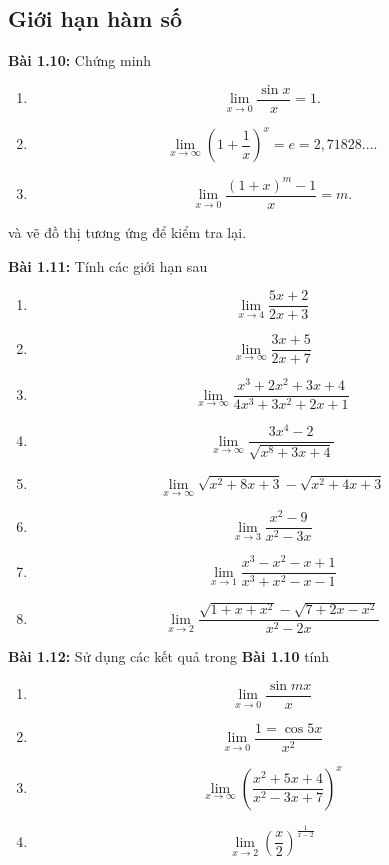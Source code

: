 \subsection*{Giới hạn hàm số}
\textbf{Bài 1.10:} Chứng minh
\begin{enumerate}[label=(\alph*)]
    \item $$\lim_{x\rightarrow 0}\frac{\sin x}{x}=1.$$
    \item $$\lim_{x\rightarrow\infty}\left(1+\frac{1}{x}\right)^x =e=2,71828... .$$
    \item \[\lim_{x\rightarrow 0}\frac{(1+x)^m -1}{x}=m.\]
\end{enumerate}
và vẽ đồ thị tương ứng để kiểm tra lại.
\vspace{5pt}

\textbf{Bài 1.11:} Tính các giới hạn sau 
\begin{enumerate}[label=(\alph*)]
    \item $$\lim_{x\rightarrow 4}\frac{5x+2}{2x+3}$$
    \item $$\lim_{x\rightarrow \infty}\frac{3x+5}{2x+7} $$
    \item $$\lim_{x\rightarrow\infty}\frac{x^3 +2x^2 +3x+4}{4x^3 +3x^2 +2x+1}$$
    \item $$\lim_{x\rightarrow\infty}\frac{3x^4 -2}{\sqrt{x^8+3x+4}}$$
    \item \[\lim_{x\rightarrow\infty}\sqrt{x^2 +8x+3}-\sqrt{x^2+4x+3}\]
    \item \[\lim_{x\rightarrow 3}\frac{x^2 -9}{x^2-3x}\]
    \item \[\lim_{x\rightarrow 1}\frac{x^3 -x^2 -x+1}{x^3+x^2 -x-1}\]
    \item \[\lim_{x\rightarrow 2}\frac{\sqrt{1+x+x^2}-\sqrt{7+2x-x^2}}{x^2-2x}\]
\end{enumerate}
\vspace{5pt}

\textbf{Bài 1.12:} Sử dụng các kết quả trong \textbf{Bài 1.10} tính
\begin{enumerate}[label=(\alph*)]
    \item \[\lim_{x\rightarrow 0}\frac{\sin mx}{x}\]
    \item \[\lim_{x\rightarrow 0}\frac{1=\cos 5x}{x^2}\]
    \item \[\lim_{x\rightarrow\infty}\left(\frac{x^2+5x+4}{x^2-3x+7}\right)^x\]
    \item \[\lim_{x\rightarrow 2}\left(\frac{x}{2}\right)^{\frac{1}{x-2}}\]
\end{enumerate}

